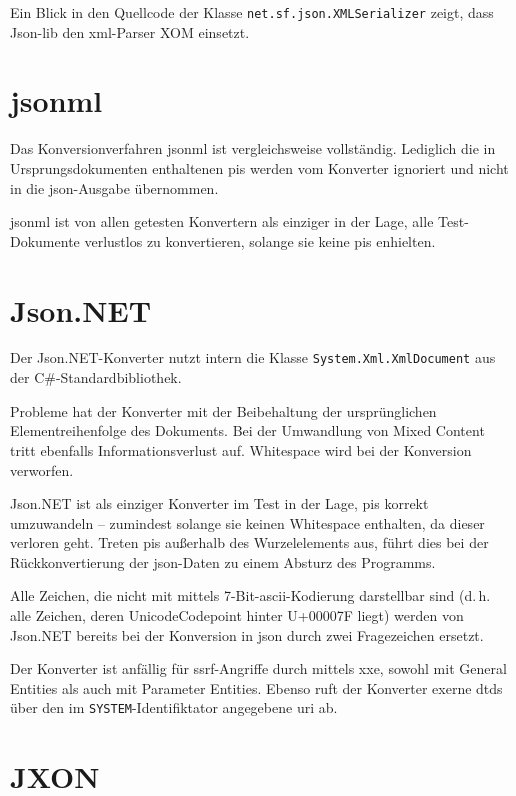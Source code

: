 Ein Blick in den Quellcode der Klasse \texttt{net.sf.json.XMLSerializer} zeigt, dass Json-lib den \acrshort{xml}-Parser XOM einsetzt.

\section{\acrshort{jsonml}}
\label{sec:jsonml}

Das Konversionverfahren \acrshort{jsonml} ist vergleichsweise vollständig. Lediglich die in Ursprungsdokumenten enthaltenen \glspl{pi} werden vom Konverter ignoriert und nicht in die \acrshort{json}-Ausgabe übernommen.

\acrshort{jsonml} ist von allen getesten Konvertern als einziger in der Lage, alle Test-Dokumente verlustlos zu konvertieren, solange sie keine \glspl{pi} enhielten.

\section{Json.NET}
\label{sec:jsondotnet}

Der Json.NET-Konverter nutzt intern die Klasse \texttt{System.Xml.XmlDocument} aus der C\#-Standardbibliothek.

Probleme hat der Konverter mit der Beibehaltung der ursprünglichen Elementreihenfolge des Dokuments. Bei der Umwandlung von Mixed Content tritt ebenfalls Informationsverlust auf. Whitespace wird bei der Konversion verworfen.

Json.NET ist als einziger Konverter im Test in der Lage, \glspl{pi} korrekt umzuwandeln -- zumindest solange sie keinen Whitespace enthalten, da dieser verloren geht. Treten \glspl{pi} außerhalb des Wurzelelements aus, führt dies bei der Rückkonvertierung der \acrshort{json}-Daten zu einem Absturz des Programms.

Alle Zeichen, die nicht mit mittels 7-Bit-\acrshort{ascii}-Kodierung darstellbar sind (d.\,h. alle Zeichen, deren UnicodeCodepoint hinter U+00007F liegt) werden von Json.NET bereits bei der Konversion in \acrshort{json} durch zwei Fragezeichen ersetzt.

Der Konverter ist anfällig für \acrshort{ssrf}-Angriffe durch mittels \acrlong{xxe}, sowohl mit General Entities als auch mit Parameter Entities. Ebenso ruft der Konverter exerne \glspl{dtd} über den im \texttt{SYSTEM}-Identifiktator angegebene \acrshort{uri} ab.

\section{JXON}
\label{sec:jxon}

